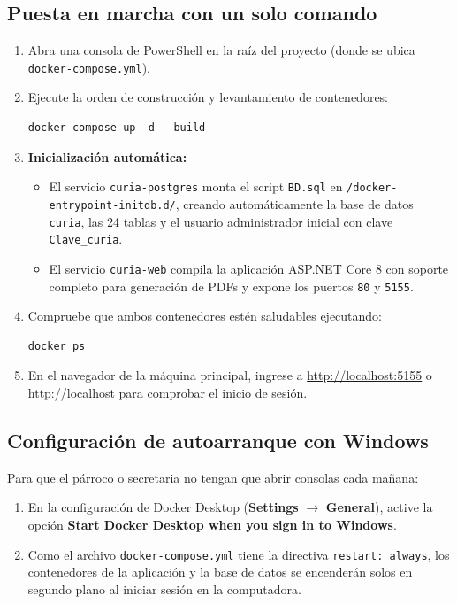 \subsection{Puesta en marcha con un solo comando}
\begin{enumerate}
    \item Abra una consola de PowerShell en la raíz del proyecto (donde se ubica \texttt{docker-compose.yml}).
    \item Ejecute la orden de construcción y levantamiento de contenedores:
    \begin{lstlisting}[style=consola]
docker compose up -d --build
\end{lstlisting}
    \item \textbf{Inicialización automática:}
    \begin{itemize}
        \item El servicio \texttt{curia-postgres} monta el script \texttt{BD.sql} en \texttt{/docker-entrypoint-initdb.d/}, creando automáticamente la base de datos \texttt{curia}, las 24 tablas y el usuario administrador inicial con clave \texttt{Clave\_curia}.
        \item El servicio \texttt{curia-web} compila la aplicación ASP.NET Core 8 con soporte completo para generación de PDFs y expone los puertos \texttt{80} y \texttt{5155}.
    \end{itemize}
    \item Compruebe que ambos contenedores estén saludables ejecutando:
    \begin{lstlisting}[style=consola]
docker ps
\end{lstlisting}
    \item En el navegador de la máquina principal, ingrese a \url{http://localhost:5155} o \url{http://localhost} para comprobar el inicio de sesión.
\end{enumerate}

\subsection{Configuración de autoarranque con Windows}
Para que el párroco o secretaria no tengan que abrir consolas cada mañana:
\begin{enumerate}
    \item En la configuración de Docker Desktop (\textbf{Settings} $\rightarrow$ \textbf{General}), active la opción \textbf{Start Docker Desktop when you sign in to Windows}.
    \item Como el archivo \texttt{docker-compose.yml} tiene la directiva \texttt{restart: always}, los contenedores de la aplicación y la base de datos se encenderán solos en segundo plano al iniciar sesión en la computadora.
\end{enumerate}

